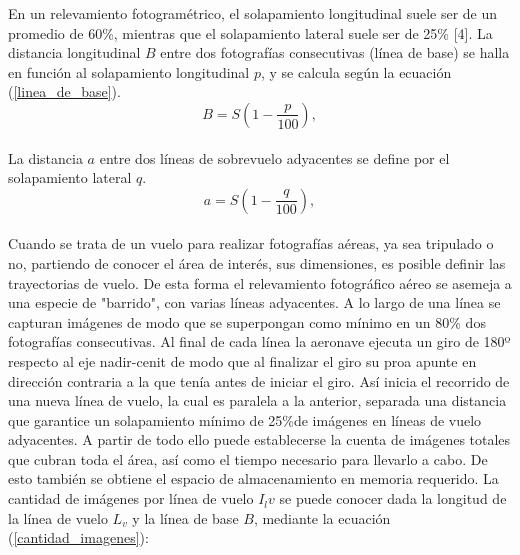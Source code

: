 En un relevamiento fotogramétrico, el solapamiento longitudinal suele ser de un promedio de 60\%, mientras que el solapamiento lateral suele ser de 25\% [4]. La distancia longitudinal $B$ entre dos fotografías consecutivas (línea de base) se halla en función al solapamiento longitudinal $p$, y se calcula según la ecuación (\ref{linea_de_base}).
\\
\begin{equation}
	B=S(1-\frac{p}{100}),\label{linea_de_base}
\end{equation}
\\
La distancia $a$ entre dos líneas de sobrevuelo adyacentes se define por el solapamiento lateral $q$.
\\
\begin{equation}
	a=S(1-\frac{q}{100}),\label{distancia_adyacente}
\end{equation}
\\
Cuando se trata de un vuelo para realizar fotografías aéreas, ya sea tripulado o no, partiendo de conocer el área de interés, sus dimensiones, es posible definir las trayectorias de vuelo. De esta forma el relevamiento fotográfico aéreo se asemeja a una especie de "barrido", con varias líneas adyacentes. A lo largo de una línea se capturan imágenes de modo que se superpongan como mínimo en un 80\% dos fotografías consecutivas. Al final de cada línea la aeronave ejecuta un giro de 180º respecto al eje nadir-cenit de modo que al finalizar el giro su proa apunte en dirección contraria a la que tenía antes de iniciar el giro. Así inicia el recorrido de una nueva línea de vuelo, la cual es paralela a la anterior, separada una distancia que garantice un solapamiento mínimo de 25\%de imágenes en líneas de vuelo adyacentes. A partir de todo ello puede establecerse la cuenta de imágenes totales que cubran toda el área, así como el tiempo necesario para llevarlo a cabo. De esto también se obtiene el espacio de almacenamiento en memoria requerido.
La cantidad de imágenes por línea de vuelo $I_lv$ se puede conocer dada la longitud de la línea de vuelo $L_v$ y la línea de base $B$, mediante la ecuación (\ref{cantidad_imagenes}):
